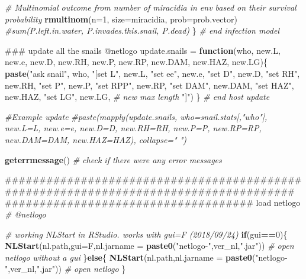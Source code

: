 \documentclass[10,portrait]{article}
\newenvironment{Shaded}{\begin{snugshade}}{\end{snugshade}}
\newcommand{\KeywordTok}[1]{\textcolor[rgb]{0.13,0.29,0.53}{\textbf{#1}}}
\newcommand{\DataTypeTok}[1]{\textcolor[rgb]{0.13,0.29,0.53}{#1}}
\newcommand{\DecValTok}[1]{\textcolor[rgb]{0.00,0.00,0.81}{#1}}
\newcommand{\StringTok}[1]{\textcolor[rgb]{0.31,0.60,0.02}{#1}}
\newcommand{\CommentTok}[1]{\textcolor[rgb]{0.56,0.35,0.01}{\textit{#1}}}
\newcommand{\ControlFlowTok}[1]{\textcolor[rgb]{0.13,0.29,0.53}{\textbf{#1}}}
\newcommand{\OperatorTok}[1]{\textcolor[rgb]{0.81,0.36,0.00}{\textbf{#1}}}
\newcommand{\NormalTok}[1]{#1}
\begin{document}
\begin{Shaded}
\begin{Highlighting}[]
{{  \CommentTok{# Multinomial outcome from number of miracidia in env based on their survival probability}
  \KeywordTok{rmultinom}\NormalTok{(}\DataTypeTok{n=}\DecValTok{1}\NormalTok{, }\DataTypeTok{size=}\NormalTok{miracidia, }\DataTypeTok{prob=}\NormalTok{prob.vector)}
  \CommentTok{#sum(P.left.in.water, P.invades.this.snail, P.dead)}
\NormalTok{\} }\CommentTok{# end infection model }

\NormalTok{### update all the snails @netlogo}
\NormalTok{update.snails =}\StringTok{ }\ControlFlowTok{function}\NormalTok{(who, new.L, new.e, new.D, new.RH, new.P, new.RP, new.DAM, new.HAZ, new.LG)\{}
  \KeywordTok{paste}\NormalTok{(}\StringTok{"ask snail"}\NormalTok{, who, }
        \StringTok{"[set L"}\NormalTok{, new.L,}
        \StringTok{"set ee"}\NormalTok{, new.e,}
        \StringTok{"set D"}\NormalTok{, new.D,}
        \StringTok{"set RH"}\NormalTok{, new.RH,}
        \StringTok{"set P"}\NormalTok{, new.P,        }
        \StringTok{"set RPP"}\NormalTok{, new.RP,       }
        \StringTok{"set DAM"}\NormalTok{, new.DAM,}
        \StringTok{"set HAZ"}\NormalTok{, new.HAZ,}
        \StringTok{"set LG"}\NormalTok{, new.LG, }\CommentTok{# new max length}
        \StringTok{"]"}\NormalTok{)}
\NormalTok{\} }\CommentTok{# end host update}

\CommentTok{#Example update}
\CommentTok{#paste(mapply(update.snails, who=snail.stats[,"who"], new.L=L, new.e=e, new.D=D, new.RH=RH, new.P=P, new.RP=RP, new.DAM=DAM, new.HAZ=HAZ), collapse=" ")}

\KeywordTok{geterrmessage}\NormalTok{() }\CommentTok{# check if there were any error messages  }

\NormalTok{#####################################################################################}
\NormalTok{####################################  load netlogo }
\CommentTok{# @netlogo}

\CommentTok{# working NLStart in RStudio. works with gui=F (2018/09/24)}
\ControlFlowTok{if}\NormalTok{(gui}\OperatorTok{==}\DecValTok{0}\NormalTok{)\{}
  \KeywordTok{NLStart}\NormalTok{(nl.path,}\DataTypeTok{gui=}\NormalTok{F,}\DataTypeTok{nl.jarname =} \KeywordTok{paste0}\NormalTok{(}\StringTok{"netlogo-"}\NormalTok{,ver_nl,}\StringTok{".jar"}\NormalTok{)) }\CommentTok{# open netlogo without a gui  }
\NormalTok{\}}\ControlFlowTok{else}\NormalTok{\{}
  \KeywordTok{NLStart}\NormalTok{(nl.path,}\DataTypeTok{nl.jarname =} \KeywordTok{paste0}\NormalTok{(}\StringTok{"netlogo-"}\NormalTok{,ver_nl,}\StringTok{".jar"}\NormalTok{)) }\CommentTok{# open netlogo}
\NormalTok{\}}

}}
\end{Highlighting}
\end{Shaded}
\end{document}
